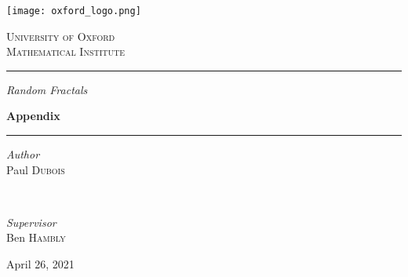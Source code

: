 \clearpage\null\newpage
\begin{titlepage}
	\newcommand{\HRule}{\rule{\linewidth}{0.5mm}}
		\begin{center}
		\texttt{[image: oxford\_logo.png]}
		\vspace*{1cm}
		
		\textsc{\LARGE University of Oxford}\\[0.75cm]
		\textsc{\LARGE Mathematical Institute}
		
		\vspace{1.5cm}
		
		\HRule
		\vspace{0.75cm}
		
		\textit{\LARGE Random Fractals}
		\vspace{0.5cm}
		
		\textbf{\huge Appendix}
		
		\vspace{0.5cm}
		\HRule
		
		\vspace{1.5cm}
		
		\begin{minipage}{0.4\textwidth}
			\begin{flushleft}
				\large
				\textit{Author}\\
				Paul \textsc{Dubois}
			\end{flushleft}
		\end{minipage}
		~
		\begin{minipage}{0.4\textwidth}
			\begin{flushright}
				\large
				\textit{Supervisor}\\
				Ben \textsc{Hambly}
			\end{flushright}
		\end{minipage}
		
		\vfill
		
		{\large April 26, 2021}
	\end{center}
\end{titlepage}